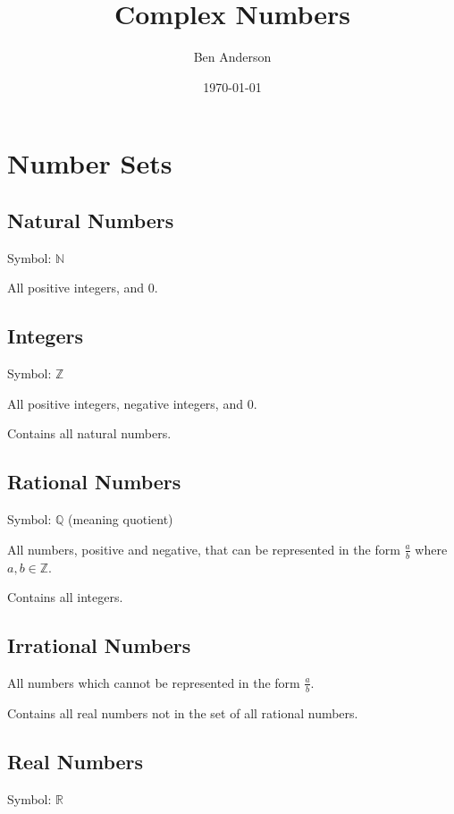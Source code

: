 \documentclass[a4paper,11pt]{article}
\begin{document}
\title{Complex Numbers}
\author{Ben Anderson}
\date{\today}
\maketitle
\pagebreak

\tableofcontents
\pagebreak


\section{Number Sets}

\subsection{Natural Numbers}

Symbol: $\mathbb{N}$

All positive integers, and 0.


\subsection{Integers}

Symbol: $\mathbb{Z}$

All positive integers, negative integers, and 0.

Contains all natural numbers.


\subsection{Rational Numbers}

Symbol: $\mathbb{Q}$ (meaning quotient)

All numbers, positive and negative, that can be represented in the form
$\frac{a}{b}$ where $a, b \in \mathbb{Z}$.

Contains all integers.


\subsection{Irrational Numbers}

All numbers which cannot be represented in the form $\frac{a}{b}$.

Contains all real numbers not in the set of all rational numbers.


\subsection{Real Numbers}

Symbol: $\mathbb{R}$
\end{document}
